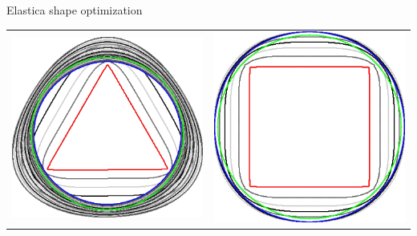\begin{frame}
{Elastica shape optimization}

\center

\begin{tabular}{cc}
\includegraphics[scale=0.12]{figures/elastica-minimization/with-neighborhood-flow/radius_16/triangle.png}\hspace{3em} &
\includegraphics[scale=0.12]{figures/elastica-minimization/with-neighborhood-flow/radius_16/square.png}\\[2em]

\end{tabular}
\end{frame}
